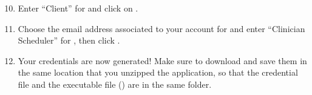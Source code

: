 \documentclass[letterpaper,10pt,english]{sphinxmanual}
\begin{document}
\begin{DUlineblock}{0em}
\item[] 
\end{DUlineblock}
\begin{enumerate}
\setcounter{enumi}{9}
\item {} 
Enter “Client” for  and click on .

\end{enumerate}

\begin{figure}[h!]
\centering
{}\end{figure}

\begin{DUlineblock}{0em}
\item[] 
\end{DUlineblock}
\begin{enumerate}
\setcounter{enumi}{10}
\item {} 
Choose the email address associated to your account for 
and enter “Clinician Scheduler” for , then
click .

\end{enumerate}

\begin{figure}[h!]
\centering
{}\end{figure}

\begin{DUlineblock}{0em}
\item[] 
\end{DUlineblock}
\begin{enumerate}
\setcounter{enumi}{11}
\item {} 
Your credentials are now generated! Make sure to download and save
them in the same location that you unzipped the application, so that
the credential file and the executable file () are in the same folder.

\end{enumerate}

\begin{figure}[h!]
\centering
{}\end{figure}
\end{document}

